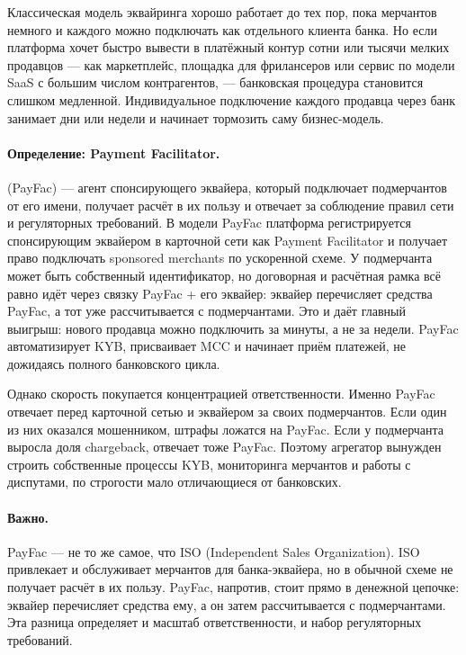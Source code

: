 Классическая модель эквайринга хорошо работает до тех пор,
пока мерчантов немного и каждого можно подключать как отдельного
клиента банка. Но если платформа хочет быстро вывести в платёжный
контур сотни или тысячи мелких продавцов --- как маркетплейс,
площадка для фрилансеров или сервис по модели SaaS с большим числом
контрагентов, --- банковская процедура становится слишком
медленной. Индивидуальное подключение каждого продавца через банк
занимает дни или недели и начинает тормозить саму бизнес-модель.

\paragraph{Определение: Payment Facilitator.}
 (PayFac) --- агент спонсирующего эквайера, который подключает подмерчантов от его имени, получает расчёт в их пользу и отвечает за соблюдение правил сети и регуляторных требований.
В модели PayFac платформа регистрируется спонсирующим эквайером
в карточной сети как Payment Facilitator и получает право
подключать sponsored merchants по ускоренной схеме. У подмерчанта
может быть собственный идентификатор, но договорная и расчётная
рамка всё равно идёт через связку PayFac + его эквайер: эквайер
перечисляет средства PayFac, а тот уже рассчитывается
с подмерчантами. Это и даёт главный выигрыш: нового продавца
можно подключить за минуты, а не за недели. PayFac автоматизирует
KYB, присваивает MCC и начинает приём платежей, не дожидаясь
полного банковского цикла.\cite{visa-acceptance-entities,visa-payment-facilitator-marketplace-risk-guide}

Однако скорость покупается концентрацией ответственности.
Именно PayFac отвечает перед карточной сетью и эквайером
за своих подмерчантов. Если один из них оказался мошенником,
штрафы ложатся на PayFac. Если у подмерчанта выросла доля
chargeback, отвечает тоже PayFac. Поэтому агрегатор вынужден
строить собственные процессы KYB, мониторинга мерчантов
и работы с диспутами, по строгости мало отличающиеся
от банковских.\cite{visa-acceptance-entities,visa-payment-facilitator-marketplace-risk-guide}

\paragraph{Важно.}
  PayFac --- не то же самое, что ISO (Independent Sales
  Organization). ISO привлекает и обслуживает мерчантов
  для банка-эквайера, но в обычной схеме не получает расчёт
  в их пользу. PayFac, напротив, стоит прямо в денежной цепочке:
  эквайер перечисляет средства ему, а он затем рассчитывается
  с подмерчантами. Эта разница определяет и масштаб
  ответственности, и набор регуляторных требований.\cite{visa-tpa-registration-program-faqs,visa-acceptance-entities}


